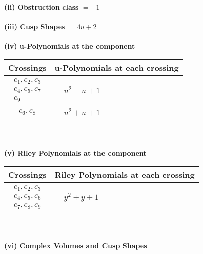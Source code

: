 \documentclass[1p]{elsarticle_modified}
\theoremstyle{definition}
\begin{document}
\flushleft \textbf{(ii) Obstruction class $= -1$}\\~\\
\flushleft \textbf{(iii) Cusp Shapes $= 4 u+2$}\\~\\
\newpage\renewcommand{\arraystretch}{1}
\flushleft \textbf{(iv) u-Polynomials at the component}\newline \\
\begin{tabular}{m{50pt}|m{274pt}}
Crossings & \hspace{64pt}u-Polynomials at each crossing \\
\hline $$\begin{aligned}c_{1},c_{2},c_{3}\\c_{4},c_{5},c_{7}\\c_{9}\end{aligned}$$&$\begin{aligned}
&u^2- u+1
\end{aligned}$\\
\hline $$\begin{aligned}c_{6},c_{8}\end{aligned}$$&$\begin{aligned}
&u^2+u+1
\end{aligned}$\\
\hline
\end{tabular}\\~\\
\newpage\renewcommand{\arraystretch}{1}
\flushleft \textbf{(v) Riley Polynomials at the component}\newline \\
\begin{tabular}{m{50pt}|m{274pt}}
Crossings & \hspace{64pt}Riley Polynomials at each crossing \\
\hline $$\begin{aligned}c_{1},c_{2},c_{3}\\c_{4},c_{5},c_{6}\\c_{7},c_{8},c_{9}\end{aligned}$$&$\begin{aligned}
&y^2+y+1
\end{aligned}$\\
\hline
\end{tabular}\\~\\
\newpage\flushleft \textbf{(vi) Complex Volumes and Cusp Shapes}
\end{document}
